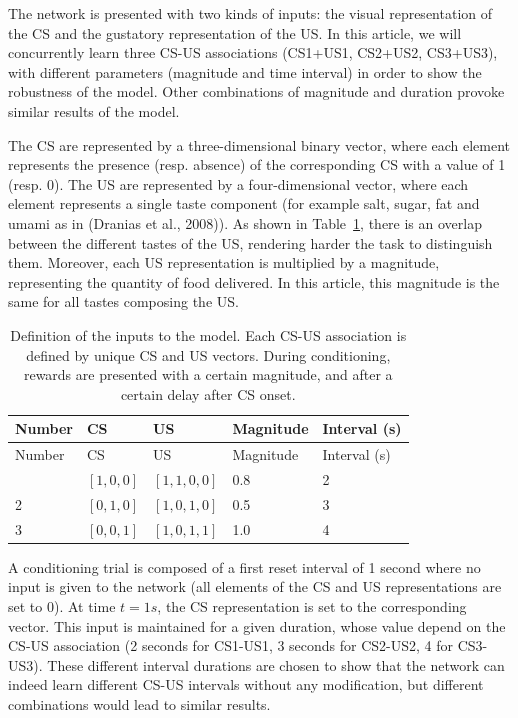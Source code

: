 \documentclass[
  11pt,
  a4paper,
]{scrbook}
\begin{document}
The network is presented with two kinds of inputs: the visual
representation of the CS and the gustatory representation of the US. In
this article, we will concurrently learn three CS-US associations
(CS1+US1, CS2+US2, CS3+US3), with different parameters (magnitude and
time interval) in order to show the robustness of the model. Other
combinations of magnitude and duration provoke similar results of the
model.

The CS are represented by a three-dimensional binary vector, where each
element represents the presence (resp. absence) of the corresponding CS
with a value of 1 (resp. 0). The US are represented by a
four-dimensional vector, where each element represents a single taste
component (for example salt, sugar, fat and umami as in (Dranias et al.,
2008)). As shown in Table~\ref{tbl-inputs}, there is an overlap between
the different tastes of the US, rendering harder the task to distinguish
them. Moreover, each US representation is multiplied by a magnitude,
representing the quantity of food delivered. In this article, this
magnitude is the same for all tastes composing the US.

\begin{longtable}[]{@{}lllll@{}}
\caption{Definition of the inputs to the model. Each CS-US association
is defined by unique CS and US vectors. During conditioning, rewards are
presented with a certain magnitude, and after a certain delay after CS
onset.}\label{tbl-inputs}\tabularnewline
\toprule\noalign{}
Number & CS & US & Magnitude & Interval (s) \\
\midrule\noalign{}
\endfirsthead
\toprule\noalign{}
Number & CS & US & Magnitude & Interval (s) \\
\midrule\noalign{}
\endhead
\bottomrule\noalign{}
\endlastfoot
1 & \([1, 0, 0]\) & \([1, 1, 0, 0]\) & 0.8 & 2 \\
2 & \([0, 1, 0]\) & \([1, 0, 1, 0]\) & 0.5 & 3 \\
3 & \([0, 0, 1]\) & \([1, 0, 1, 1]\) & 1.0 & 4 \\
\end{longtable}

A conditioning trial is composed of a first reset interval of 1 second
where no input is given to the network (all elements of the CS and US
representations are set to 0). At time \(t=1s\), the CS representation
is set to the corresponding vector. This input is maintained for a given
duration, whose value depend on the CS-US association (2 seconds for
CS1-US1, 3 seconds for CS2-US2, 4 for CS3-US3). These different interval
durations are chosen to show that the network can indeed learn different
CS-US intervals without any modification, but different combinations
would lead to similar results.
\end{document}
